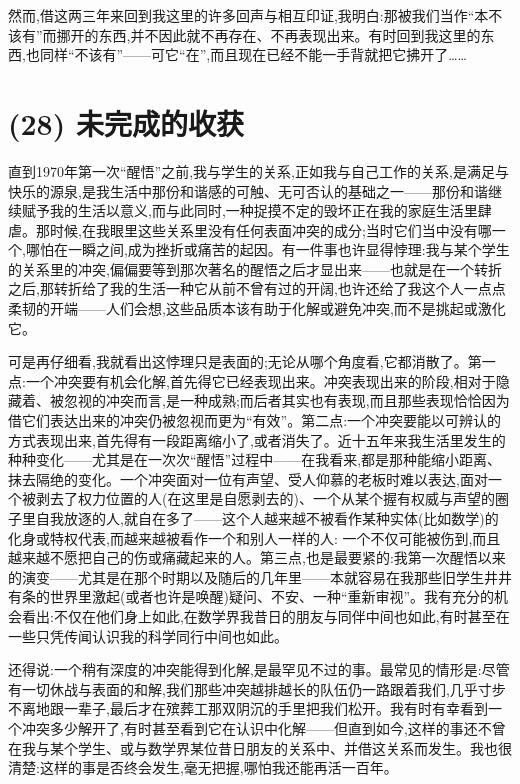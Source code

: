然而,借这两三年来回到我这里的许多回声与相互印证,我明白:那被我们当作“本不该有”而挪开的东西,并不因此就不再存在、不再表现出来。有时回到我这里的东西,也同样“不该有”——可它“在”,而且现在已经不能一手背就把它拂开了……

\section{(28) 未完成的收获}

直到1970年第一次“醒悟”之前,我与学生的关系,正如我与自己工作的关系,是满足与快乐的源泉,是我生活中那份和谐感的可触、无可否认的基础之一——那份和谐继续赋予我的生活以意义,而与此同时,一种捉摸不定的毁坏正在我的家庭生活里肆虐。那时候,在我眼里这些关系里没有任何表面冲突的成分;当时它们当中没有哪一个,哪怕在一瞬之间,成为挫折或痛苦的起因。有一件事也许显得悖理:我与某个学生的关系里的冲突,偏偏要等到那次著名的醒悟之后才显出来——也就是在一个转折之后,那转折给了我的生活一种它从前不曾有过的开阔,也许还给了我这个人一点点柔韧的开端——人们会想,这些品质本该有助于化解或避免冲突,而不是挑起或激化它。

可是再仔细看,我就看出这悖理只是表面的;无论从哪个角度看,它都消散了。第一点:一个冲突要有机会化解,首先得它已经表现出来。冲突表现出来的阶段,相对于隐藏着、被忽视的冲突而言,是一种成熟;而后者其实也有表现,而且那些表现恰恰因为借它们表达出来的冲突仍被忽视而更为“有效”。第二点:一个冲突要能以可辨认的方式表现出来,首先得有一段距离缩小了,或者消失了。近十五年来我生活里发生的种种变化——尤其是在一次次“醒悟”过程中——在我看来,都是那种能缩小距离、抹去隔绝的变化。一个冲突面对一位有声望、受人仰慕的老板时难以表达,面对一个被剥去了权力位置的人(在这里是自愿剥去的)、一个从某个握有权威与声望的圈子里自我放逐的人,就自在多了——这个人越来越不被看作某种实体(比如数学)的化身或特权代表,而越来越被看作一个和别人一样的人:%
一个不仅可能被伤到,而且越来越不愿把自己的伤或痛藏起来的人。第三点,也是最要紧的:我第一次醒悟以来的演变——尤其是在那个时期以及随后的几年里——本就容易在我那些旧学生井井有条的世界里激起(或者也许是唤醒)疑问、不安、一种“重新审视”。我有充分的机会看出:不仅在他们身上如此,在数学界我昔日的朋友与同伴中间也如此,有时甚至在一些只凭传闻认识我的科学同行中间也如此。

还得说:一个稍有深度的冲突能得到化解,是最罕见不过的事。最常见的情形是:尽管有一切休战与表面的和解,我们那些冲突越排越长的队伍仍一路跟着我们,几乎寸步不离地跟一辈子,最后才在殡葬工那双阴沉的手里把我们松开。我有时有幸看到一个冲突多少解开了,有时甚至看到它在认识中化解——但直到如今,这样的事还不曾在我与某个学生、或与数学界某位昔日朋友的关系中、并借这关系而发生。我也很清楚:这样的事是否终会发生,毫无把握,哪怕我还能再活一百年。

